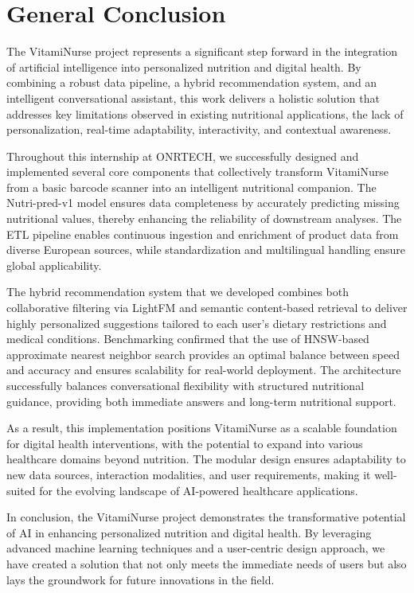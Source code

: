 \newpage
\section*{General Conclusion}
The VitamiNurse project represents a significant step forward in the integration of artificial intelligence into personalized nutrition and digital health. 
By combining a robust data pipeline, 
a hybrid recommendation system, and an intelligent conversational assistant, this work delivers a holistic solution that addresses key limitations observed 
in existing nutritional applications, the lack of personalization, real-time adaptability, interactivity, and contextual awareness. 

Throughout this internship at ONRTECH, we successfully designed and implemented several core components that collectively transform VitamiNurse from a basic 
barcode scanner into an intelligent nutritional companion. The Nutri-pred-v1 model ensures data completeness by accurately predicting missing nutritional values, 
thereby enhancing the reliability of downstream analyses. The ETL pipeline enables continuous ingestion and enrichment of product data from diverse European sources, 
while standardization and multilingual handling ensure global applicability. 

The hybrid recommendation system that we developed combines both collaborative filtering via LightFM and semantic content-based retrieval to deliver highly personalized suggestions tailored to each user’s dietary restrictions and medical conditions. 
Benchmarking confirmed that the use of HNSW-based approximate nearest neighbor search provides an optimal balance between speed and accuracy and  ensures scalability for real-world deployment. 
The architecture successfully balances conversational flexibility with structured nutritional guidance, providing both immediate answers and long-term nutritional support.

As a result, this implementation positions VitamiNurse as a scalable foundation for digital health interventions, with the potential to expand into various healthcare domains beyond nutrition. 
The modular design ensures adaptability to new data sources, interaction modalities, and user requirements, making it well-suited for the evolving landscape of AI-powered healthcare applications.

In conclusion, the VitamiNurse project demonstrates the transformative potential of AI in enhancing personalized nutrition and digital health. By leveraging advanced machine learning techniques and a user-centric design approach, we have created a solution that not only meets the immediate needs of users but also lays the groundwork for future innovations in the field.